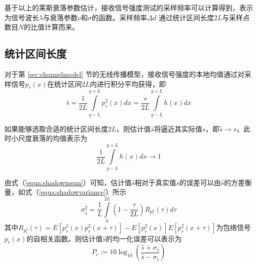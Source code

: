基于以上的莱斯衰落参数估计，接收信号强度测试的采样频率可以计算得到，表示为信号波长$\lambda$与衰落参数$\nu$和$\sigma$的函数。采样频率$\Delta d$ 通过统计区间长度$2L$与采样点数目$N$的比值计算而来。

\subsection{统计区间长度}
\label{sec:length}

对于第 \ref{sec:channelmodel} 节的无线传播模型，接收信号强度的本地均值通过对采样信号$p_r(x)$在统计区间$2L$内进行积分平均获得，即
\begin{equation}
    \hat{s}=\frac{1}{2L}\int\limits_{y-L}^{y+L} p_r^2(x)dx=\frac{s}{2L}\int\limits_{y-L}^{y+L} h(x)dx
\label{equa:shadowmean}
\end{equation}

如果能够选取合适的统计区间长度$2L$，则估计值$\hat{s}$将逼近其实际值$s$，即$\hat{s}\rightarrow s$，此时小尺度衰落的均值表示为
\begin{equation}
\frac{1}{2L}\int\limits_{y-L}^{y+L} h(x)dx \rightarrow 1
\label{equa:shortterm}
\end{equation}

由式（\ref{equa:shadowmean}）可知，估计值$\hat{s}$相对于真实值$s$的误差可以由$\hat{s}$的方差衡量，如式（\ref{equa:shadowvariance}）所示
\begin{equation}
    \sigma_{\hat{s}}^{2}=\frac{1}{L}\int\limits_{0}^{2L}\left(1-\frac{\tau}{2L}\right)R_{p_{r}^2}(\tau)d\tau
\label{equa:shadowvariance}
\end{equation}
其中$R_{p_{r}^2}(\tau)=E[p_{r}^{2}(x)p_{r}^{2}(x+\tau)]-E[p_{r}^{2}(x)]E[p_{r}^{2}(x+\tau)]$为包络信号$p_{r}(x)$的自相关函数。则估计值$\hat{s}$的均一化误差可以表示为
\begin{equation}
P_e:=10 \log_{10}\left(\frac{\hat{s}+\sigma_{\hat{s}}}{\hat{s}-\sigma_{\hat{s}}}\right)
\label{equa:perror}
\end{equation}

\begin{figure}[!htp]
  \centering
    \hspace{1cm}
  \hspace{1in}
  \centering
    \hspace{1cm}
\end{figure}

